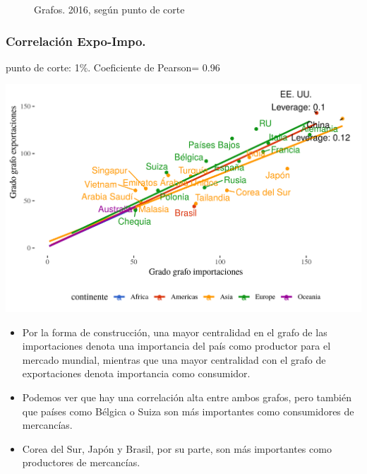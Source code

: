 \documentclass[compress]{beamer}
\begin{document}
\begin{frame}
\begin{figure}
		\caption{Grafos. 2016, según punto de corte}
		\label{fig:grafo_2016}
	\end{figure}
	
\end{frame}



\begin{frame}


\frametitle{Correlación Expo-Impo.}

punto de corte: 1\%.
Coeficiente de Pearson= 0.96

\includegraphics[width=\linewidth]{Graficos/corr_grados_2016_1_pcnt}

\end{frame}

\begin{frame}

\begin{itemize}
	\item[\faRebel] Por la forma de construcción, una mayor centralidad en el grafo de las importaciones denota una importancia del país como productor para el mercado mundial, mientras que una mayor centralidad con el grafo de exportaciones denota importancia como consumidor.
	\item[\faRebel] Podemos ver que hay una correlación alta entre ambos grafos, pero también que países como Bélgica o Suiza son más importantes como consumidores de mercancías.
	\item[\faRebel] Corea del Sur, Japón y Brasil, por su parte, son más importantes como productores de mercancías. 
\end{itemize}
\end{frame}
\end{document}
